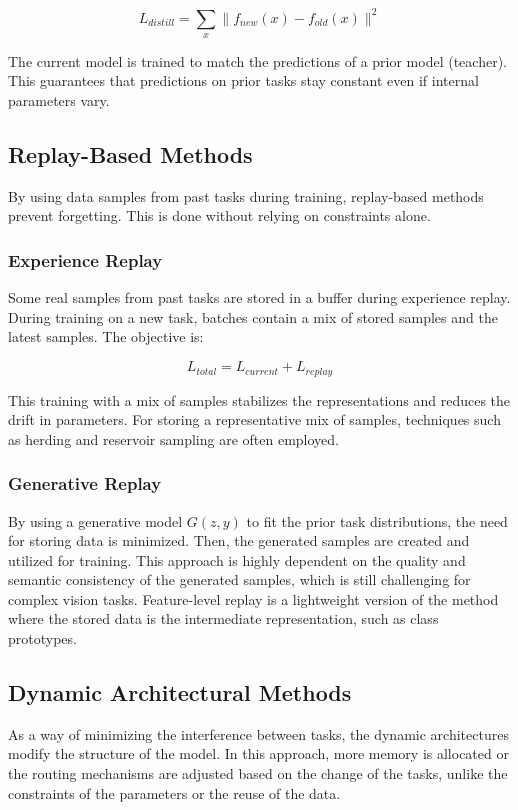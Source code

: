 \documentclass[english, LaM, oneside]{sapthesis}%
\numberwithin{equation}{chapter}
\begin{document}
\begin{equation}
    L_{distill}=\sum_{x}{\parallel f_{new}\left(x\right)-f_{old}\left(x\right)\parallel^2}
\end{equation}

The current model is trained to match the predictions of a prior model (teacher). This guarantees that predictions on prior tasks stay constant even if internal parameters vary.

\subsection{Replay-Based Methods}
By using data samples from past tasks during training, replay-based methods prevent forgetting. This is done without relying on constraints alone.
\subsubsection{Experience Replay}
Some real samples from past tasks are stored in a buffer during experience replay. During training on a new task, batches contain a mix of stored samples and the latest samples. The objective is:

\begin{equation}
    L_{total}=L_{current}+L_{replay}
\end{equation}

This training with a mix of samples stabilizes the representations and reduces the drift in parameters. For storing a representative mix of samples, techniques such as herding and reservoir sampling\cite{21} are often employed.

\subsubsection{Generative Replay}
By using a generative model $G\left(z,y\right)$ to fit the prior task distributions, the need for storing data is minimized\cite{10}. Then, the generated samples are created and utilized for training. This approach is highly dependent on the quality and semantic consistency of the generated samples, which is still challenging for complex vision tasks. Feature-level replay is a lightweight version of the method where the stored data is the intermediate representation, such as class prototypes.
\subsection{Dynamic Architectural Methods}
As a way of minimizing the interference between tasks, the dynamic architectures modify the structure of the model. In this approach, more memory is allocated or the routing mechanisms are adjusted based on the change of the tasks, unlike the constraints of the parameters or the reuse of the data.
\end{document}
